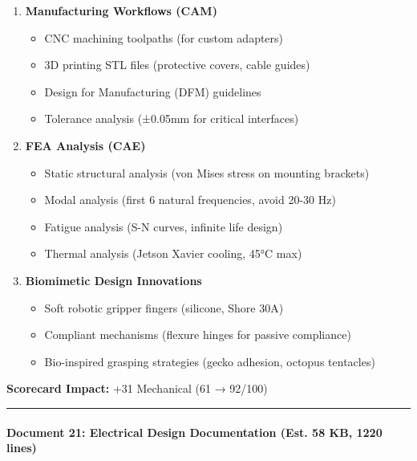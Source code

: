 \documentclass[
]{article}
\providecommand{\tightlist}{%
  \setlength{\itemsep}{0pt}\setlength{\parskip}{0pt}}
\begin{document}
\begin{enumerate}
\def\labelenumi{\arabic{enumi}.}
\setcounter{enumi}{1}
\tightlist
\item
  \textbf{Manufacturing Workflows (CAM)}

  \begin{itemize}
  \tightlist
  \item
    CNC machining toolpaths (for custom adapters)
  \item
    3D printing STL files (protective covers, cable guides)
  \item
    Design for Manufacturing (DFM) guidelines
  \item
    Tolerance analysis (±0.05mm for critical interfaces)
  \end{itemize}
\item
  \textbf{FEA Analysis (CAE)}

  \begin{itemize}
  \tightlist
  \item
    Static structural analysis (von Mises stress on mounting brackets)
  \item
    Modal analysis (first 6 natural frequencies, avoid 20-30 Hz)
  \item
    Fatigue analysis (S-N curves, infinite life design)
  \item
    Thermal analysis (Jetson Xavier cooling, 45°C max)
  \end{itemize}
\item
  \textbf{Biomimetic Design Innovations}

  \begin{itemize}
  \tightlist
  \item
    Soft robotic gripper fingers (silicone, Shore 30A)
  \item
    Compliant mechanisms (flexure hinges for passive compliance)
  \item
    Bio-inspired grasping strategies (gecko adhesion, octopus tentacles)
  \end{itemize}
\end{enumerate}

\textbf{Scorecard Impact:} +31 Mechanical (61 → 92/100)

\begin{center}\rule{0.5\linewidth}{0.5pt}\end{center}

\hypertarget{document-21-electrical-design-documentation-est.-58-kb-1220-lines}{%
\paragraph{Document 21: Electrical Design Documentation (Est. 58 KB,
1220
lines)}\label{document-21-electrical-design-documentation-est.-58-kb-1220-lines}}
\end{document}
